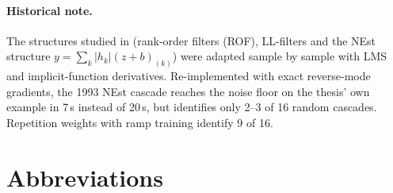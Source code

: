 \documentclass[11pt,a4paper]{article}
\theoremstyle{definition}
\theoremstyle{remark}
\begin{document}
\paragraph{Historical note.} The structures studied in \cite{delrio1993} (rank-order filters (ROF), LL-filters and the NEst structure
$y=\sum_k|h_k|(z+b)_{(k)}$) were adapted sample by sample with LMS and implicit-function derivatives. Re-implemented
with exact reverse-mode gradients, the 1993 NEst cascade reaches the noise floor on the thesis' own example in 7\,s
instead of 20\,s, but identifies only 2--3 of 16 random cascades. Repetition weights with ramp training identify 9 of 16.




\appendix
\section{Abbreviations}\label{app:abbr}
\end{document}
